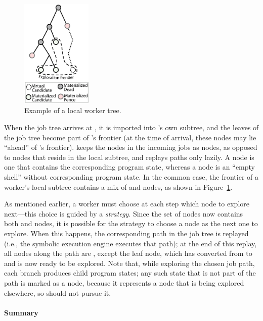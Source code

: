 \begin{figure}
  \centering
  \includegraphics[width=0.3\textwidth]{paas/figures/worker-tree-thumb}
  \caption{Example of a local worker tree.}
  \label{fig:parsymbex:localtree}
\end{figure}

When the job tree arrives at \wdst, it is imported into \wdst's own subtree, and the leaves of the job tree become part of \wdst's frontier (at the time of arrival, these nodes may lie ``ahead'' of \wdst's frontier).  \wdst keeps the nodes in the incoming jobs as {\em \virtual} nodes, as opposed to {\em \materialized} nodes that reside in the local subtree, and replays paths only lazily.  A \materialized node is one that contains the corresponding program state, whereas a \virtual node is an ``empty shell'' without corresponding program state.  In the common case, the frontier of a worker's local subtree contains a mix of \materialized and \virtual nodes, as shown in Figure~\ref{fig:parsymbex:localtree}.

As mentioned earlier, a worker must choose at each step which \candidate node to explore next---this choice is guided by a {\em strategy}.  Since the set of \candidate nodes now contains both \materialized and \virtual nodes, it is possible for the strategy to choose a \virtual node as the next one to explore.  When this happens, the corresponding path in the job tree is replayed (i.e., the symbolic execution engine executes that path); at the end of this replay, all nodes along the path are \dead, except the leaf node, which has converted from \virtual to \materialized and is now ready to be explored.  Note that, while exploring the chosen job path, each branch produces child program states; any such state that is not part of the path is marked as a \fence node, because it represents a node that is being explored elsewhere, so \wdst should not pursue it.

\paragraph{Summary}

